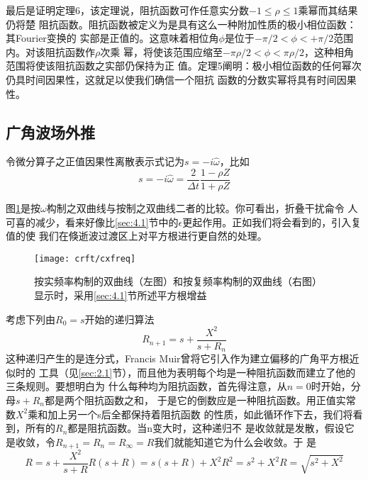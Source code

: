 最后是证明定理6，该定理说，阻抗函数可作任意实分数$-1\leq \rho\leq 1$乘幂而其结果仍将楚
阻抗函数。阻抗函数被定义为是具有这么一种附加性质的极小相位函数：其Fourier变换的
实部是正值的。这意味着相位角$\phi$是位于$-\pi/2<\phi<+\pi/2$范围内。对该阻抗函数作$\rho$次乘
幂，将使该范围应缩至$-\pi \rho/2<\phi <\pi\rho/2$，这种相角范围将使该阻抗函数之实部仍保持为正
值。定理5阐明：极小相位函数的任何幂次仍具时间因果性，这就足以使我们确信一个阻抗
函数的分数实幂将具有时间因果性。

\subsection{广角波场外推}
\label{sec:4.6.8}

令微分算子之正值因果性离散表示式记为$s=-i\hat{\omega}$，比如
\begin{equation}
s=-i\hat{\omega}=\frac{2}{\Delta t}\frac{1-\rho Z}{1+\rho Z}
\label{eq:ex4.6.29}
\end{equation}

图\ref{fig:crft/cxfreq}是按$\omega$构制之双曲线与按制之双曲线二者的比较。你可看出，折叠干扰侖令
人可喜的减少，看来好像比\ref{sec:4.1}节中的$\epsilon$更起作用。正如我们将会看到的，引入复值的使
我们在倏逝波过渡区上对平方根进行更自然的处理。

\begin{figure}[H]
\centering
\texttt{[image: crft/cxfreq]}
\caption[cxfreq]{按实频率构制的双曲线（左图）和按复频率构制的双曲线（右图）
显示时，采用\ref{sec:4.1}节所述平方根增益}
\label{fig:crft/cxfreq}
\end{figure}

考虑下列由$R_0=s$开始的递归算法
\begin{equation}
R_{n+1}=s+\frac{X^2}{s+R_n}
\label{eq:ex4.6.30}
\end{equation}
这种递归产生的是连分式，Francis
Muir曾将它引入作为建立偏移的广角平方根近似时的
工具（见\ref{sec:2.1}节），而且他为表明每个均是一种阻抗函数而建立了他的三条规则。要想明白为
什么每种均为阻抗函数，首先得注意，从$n=0$时开始，分母$s+R_n$都是两个阻抗函数之和，
于是它的倒数应是一种阻抗函数。用正值实常数$X^2$乘和加上另一个s后全都保持着阻抗函数
的性质，如此循环作下去，我们将看到，所有的$R_n$都是阻抗函数。当n变大时，这种递归不
是收敛就是发散，假设它是收敛，令$R_{n+1}=R_n=R_{\infty}=R$我们就能知道它为什么会收敛。于
是
\begin{subequations}
\begin{equation}
R=s+\frac{X^2}{s+R}
\label{eq:ex4.6.31a}
\end{equation}
\begin{equation}
R(s+R)=s(s+R)+X^2
\label{eq:ex4.6.31b}
\end{equation}
\begin{equation}
R^2=s^2+X^2
\label{eq:ex4.6.31c}
\end{equation}
\begin{equation}
R=\sqrt{s^2+X^2}
\label{eq:ex4.6.31d}
\end{equation}
\end{subequations}

